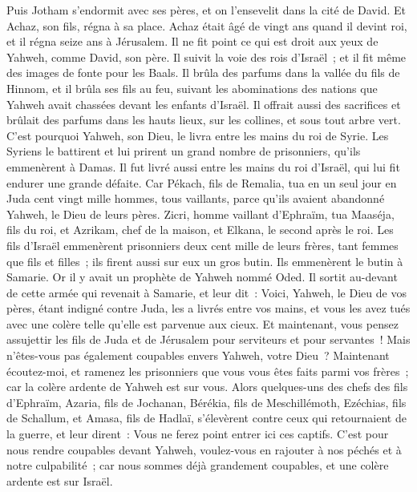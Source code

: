 \begin{multicols}{2}
Puis Jotham s'endormit avec ses pères, et on l'ensevelit dans la cité de David. Et Achaz, son fils, régna à sa place.
\VerseOne{}Achaz était âgé de vingt ans quand il devint roi, et il régna seize ans à Jérusalem. Il ne fit point ce qui est droit aux yeux de Yahweh, comme David, son père.
Il suivit la voie des rois d'Israël~; et il fit même des images de fonte pour les Baals.
Il brûla des parfums dans la vallée du fils de Hinnom, et il brûla ses fils au feu, suivant les abominations des nations que Yahweh avait chassées devant les enfants d'Israël.
Il offrait aussi des sacrifices et brûlait des parfums dans les hauts lieux, sur les collines, et sous tout arbre vert.
C'est pourquoi Yahweh, son Dieu, le livra entre les mains du roi de Syrie. Les Syriens le battirent et lui prirent un grand nombre de prisonniers, qu'ils emmenèrent à Damas. Il fut livré aussi entre les mains du roi d'Israël, qui lui fit endurer une grande défaite.
Car Pékach, fils de Remalia, tua en un seul jour en Juda cent vingt mille hommes, tous vaillants, parce qu'ils avaient abandonné Yahweh, le Dieu de leurs pères.
Zicri, homme vaillant d'Ephraïm, tua Maaséja, fils du roi, et Azrikam, chef de la maison, et Elkana, le second après le roi.
Les fils d'Israël emmenèrent prisonniers deux cent mille de leurs frères, tant femmes que fils et filles~; ils firent aussi sur eux un gros butin. Ils emmenèrent le butin à Samarie.
Or il y avait un prophète de Yahweh nommé Oded. Il sortit au-devant de cette armée qui revenait à Samarie, et leur dit~: Voici, Yahweh, le Dieu de vos pères, étant indigné contre Juda, les a livrés entre vos mains, et vous les avez tués avec une colère telle qu'elle est parvenue aux cieux.
Et maintenant, vous pensez assujettir les fils de Juda et de Jérusalem pour serviteurs et pour servantes~! Mais n'êtes-vous pas également coupables envers Yahweh, votre Dieu~?
Maintenant écoutez-moi, et ramenez les prisonniers que vous vous êtes faits parmi vos frères~; car la colère ardente de Yahweh est sur vous.
Alors quelques-uns des chefs des fils d'Ephraïm, Azaria, fils de Jochanan, Bérékia, fils de Meschillémoth, Ezéchias, fils de Schallum, et Amasa, fils de Hadlaï, s'élevèrent contre ceux qui retournaient de la guerre,
et leur dirent~: Vous ne ferez point entrer ici ces captifs. C'est pour nous rendre coupables devant Yahweh, voulez-vous en rajouter à nos péchés et à notre culpabilité~; car nous sommes déjà grandement coupables, et une colère ardente est sur Israël.

\end{multicols}
